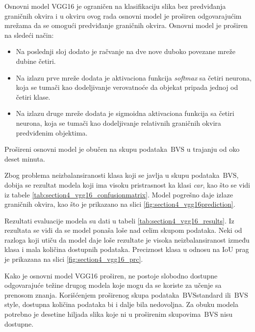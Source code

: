 \documentclass[12pt,oneside]{memoir}
\newcommand{\bvs}{\ensuremath{\,\textrm{BVS}}}
\begin{document}
Osnovni model VGG16 je ograničen na klasifikaciju slika bez predviđanja graničnih okvira i u okviru ovog rada osnovni model je proširen odgovarajućim mrežama da se omogući predviđanje graničnih okvira. Osnovni model je proširen na sledeći način:
\begin{itemize}
\item Na poslednji sloj dodato je račvanje na dve nove duboko povezane mreže dubine četiri.
\item Na izlazu prve mreže dodata je aktivaciona funkcija \textit{softmax} sa četiri neurona, koja se tumači kao dodeljivanje verovatnoće da objekat pripada jednoj od četiri klase.
\item Na izlazu druge mreže dodata je sigmoidna aktivaciona funkcija sa četiri neurona, koja se tumači kao dodeljivanje relativnih graničnih okvira predviđenim objektima.
\end{itemize}
Prošireni osnovni model je obučen na skupu podataka \bvs{} u trajanju od oko deset minuta.

Zbog problema neizbalansiranosti klasa koji se javlja u skupu podataka \bvs, dobija se rezultat modela koji ima visoku pristrasnost ka klasi \textit{car}, kao što se vidi iz tabele \ref{tab:section4_vgg16_confusionmatrix}. Model pogrešno daje izlaze graničnih okvira, kao što je prikazano na slici \ref{fig:section4_vgg16prediction}.

Rezultati evaluacije modela su dati u tabeli \ref{tab:section4_vgg16_results}. Iz rezultata se vidi da se model ponaša loše nad celim skupom podataka. Neki od razloga koji utiču da model daje loše rezultate je visoka neizbalansiranost između klasa i mala količina dostupnih podataka.%
Preciznost klasa u odnosu na IoU prag je prikazana na slici \ref{fig:section4_vgg16_prc}.

Kako je osnovni model VGG16 proširen, ne postoje slobodno dostupne odgovarajuće težine drugog modela koje mogu da se koriste za učenje sa prenosom znanja.
Korišćenjem proširenog skupa podataka \bvs{standard} ili \bvs{style}, dostupna količina podataka bi i dalje bila nedovoljna. Za obuku modela potrebno je desetine hiljada slika koje ni u proširenim skupovima \bvs{} nisu dostupne.
\end{document}
